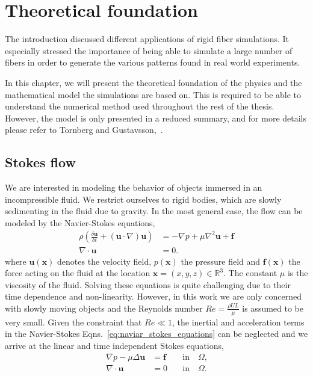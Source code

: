 \chapter{Theoretical foundation}
\label{cha:theoretical_foundation}
The introduction discussed different applications of rigid fiber simulations. It especially stressed the importance of being able to simulate a large number of fibers in order to generate the various patterns found in real world experiments.

In this chapter, we will present the theoretical foundation of the physics and the mathematical model the simulations are based on. This is required to be able to understand the numerical method used throughout the rest of the thesis. However, the model is only presented in a reduced summary, and for more details please refer to Tornberg and Gustavsson,~\cite{Tornberg2006}.

\section{Stokes flow}
\label{sec:stokes_flow}

We are interested in modeling the behavior of objects immersed in an incompressible fluid. We restrict ourselves to rigid bodies, which are slowly sedimenting in the fluid due to gravity. In the most general case, the flow can be modeled by the Navier-Stokes equations,
\begin{equation}
  \label{eq:naviar_stokes_equations}
  \begin{aligned}
    \rho\left(\frac{\delta \mathbf{u}}{\delta t} + (\mathbf{u} \cdot \nabla)\mathbf{u}\right) &= -\nabla p + \mu\nabla^2\mathbf{u} + \mathbf{f} \\
    \nabla \cdot \mathbf{u} &= 0 \text{.}
  \end{aligned}
\end{equation}
where $\mathbf{u}(\mathbf{x})$ denotes the velocity field, $p(\mathbf{x})$ the pressure field and $\mathbf{f}(\mathbf{x})$ the force acting on the fluid at the location $\mathbf{x} = (x,y,z) \in \mathbb{R}^3$. The constant $\mu$ is the viscosity of the fluid. Solving these equations is quite challenging due to their time dependence and non-linearity. However, in this work we are only concerned with slowly moving objects and the Reynolds number $Re = \frac{\rho U L}{\mu}$ is assumed to be very small. Given the constraint that $Re \ll 1$, the inertial and acceleration terms in the Navier-Stokes Eqns.~\eqref{eq:naviar_stokes_equations} can be neglected and we arrive at the linear and time independent Stokes equations,
\begin{equation}
  \label{eq:stokes_equations}
  \begin{aligned}
    \nabla p - \mu \Delta \mathbf{u} &= \mathbf{f} \quad &\text{in} \quad \Omega \text{,}\\
    \nabla \cdot \mathbf{u} &= 0 \quad &\text{in} \quad \Omega \text{.}
  \end{aligned}
\end{equation}

